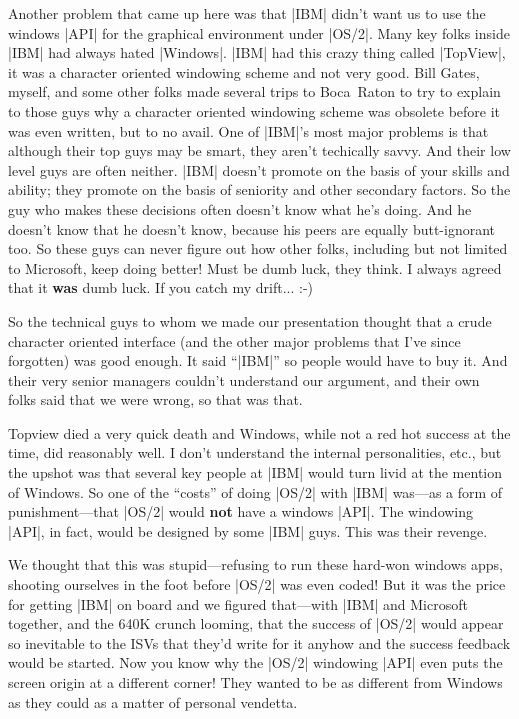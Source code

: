 Another problem that came up here was that |IBM| didn't want us to use the
windows |API| for the graphical environment under |OS/2|.  Many key folks
inside |IBM| had always hated |Windows|.  |IBM| had this crazy thing
called |TopView|,
it was a character oriented windowing scheme and not very good.  Bill Gates,
myself, and some other folks made several trips to Boca~Raton to try
to explain to those guys why a character oriented windowing scheme was
obsolete before it was even written, but to no avail.  One of |IBM|'s most
major problems is that although their top guys may be smart, they
aren't techically savvy.  And their low level guys are often neither.
|IBM| doesn't promote on the basis of your skills and ability; they promote
on the basis of seniority and other secondary factors.  So the guy
who makes these decisions often doesn't know what he's doing.  And he
doesn't know that he doesn't know, because his peers are equally
butt-ignorant too.  So these guys can never figure out how other folks, 
including but not limited to Microsoft, keep doing better!  Must be dumb luck, 
they think.  I always agreed that it {\bf was} dumb luck.  If you catch my
drift... :-)

So the technical guys to whom we made our presentation thought that
a crude character oriented interface (and the other major problems
that I've since forgotten) was good enough.  It said ``|IBM|'' so people would
have to buy it.  And their very senior managers couldn't understand our
argument, and their own folks said that we were wrong, so that was that.

Topview died a very quick death and Windows, while not a red hot success
at the time, did reasonably well.  I don't understand the internal
personalities, etc., but the upshot was that several key people at |IBM|
would turn livid at the mention of Windows.  So one of the ``costs'' of
doing |OS/2| with |IBM| was---as a form of punishment---that |OS/2| would
{\bf not} have a windows |API|.  The windowing |API|, in fact, would be designed
by some |IBM| guys.  This was their revenge.

We thought that this was stupid---refusing to run
these hard-won windows apps, shooting ourselves in the foot before |OS/2|
was even coded!  But it was the price for getting |IBM| on board and we
figured that---with |IBM| and Microsoft together, and the 640K crunch
looming, that the success of |OS/2| would appear so inevitable to the ISVs that
they'd write for it anyhow and the success feedback would be started.
Now you know why the |OS/2| windowing |API| even puts the screen origin at
a different corner!  They wanted to be as different from Windows as they
could as a matter of personal vendetta.

